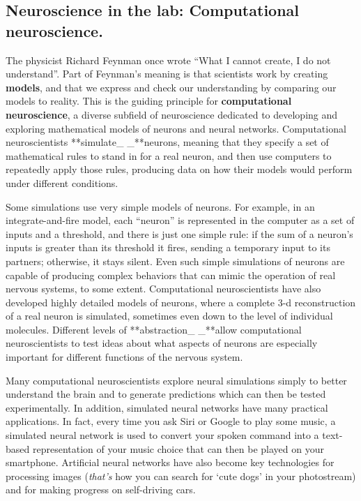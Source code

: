 \documentclass[
]{book}
\begin{document}
\hypertarget{neuroscience-in-the-lab-computational-neuroscience.}{%
\subsection{Neuroscience in the lab: Computational neuroscience.}\label{neuroscience-in-the-lab-computational-neuroscience.}}

The physicist Richard Feynman once wrote ``What I cannot create, I do not understand''. Part of Feynman's meaning is that scientists work by creating \textbf{models}, and that we express and check our understanding by comparing our models to reality. This is the guiding principle for \textbf{computational neuroscience}, a diverse subfield of neuroscience dedicated to developing and exploring mathematical models of neurons and neural networks. Computational neuroscientists **simulate\_ \_**neurons, meaning that they specify a set of mathematical rules to stand in for a real neuron, and then use computers to repeatedly apply those rules, producing data on how their models would perform under different conditions.

Some simulations use very simple models of neurons. For example, in an integrate-and-fire model, each ``neuron'' is represented in the computer as a set of inputs and a threshold, and there is just one simple rule: if the sum of a neuron's inputs is greater than its threshold it fires, sending a temporary input to its partners; otherwise, it stays silent. Even such simple simulations of neurons are capable of producing complex behaviors that can mimic the operation of real nervous systems, to some extent. Computational neuroscientists have also developed highly detailed models of neurons, where a complete 3-d reconstruction of a real neuron is simulated, sometimes even down to the level of individual molecules. Different levels of **abstraction\_ \_**allow computational neuroscientists to test ideas about what aspects of neurons are especially important for different functions of the nervous system.

Many computational neuroscientists explore neural simulations simply to better understand the brain and to generate predictions which can then be tested experimentally. In addition, simulated neural networks have many practical applications. In fact, every time you ask Siri or Google to play some music, a simulated neural network is used to convert your spoken command into a text-based representation of your music choice that can then be played on your smartphone. Artificial neural networks have also become key technologies for processing images (\emph{that's} how you can search for `cute dogs' in your photostream) and for making progress on self-driving cars.
\end{document}
